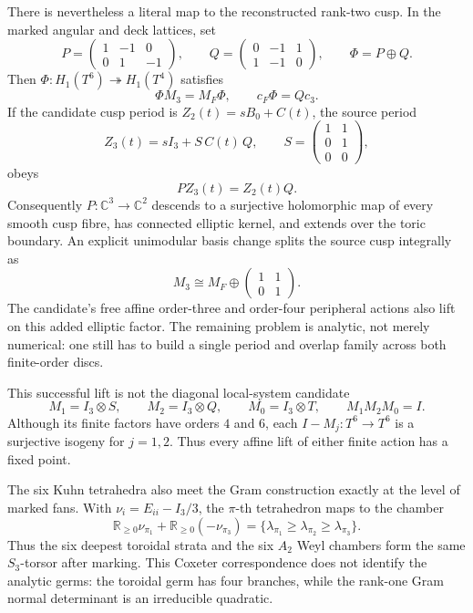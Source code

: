 \documentclass[10pt,letterpaper]{article}
\begin{document}
There is nevertheless a literal map to the reconstructed rank-two cusp.  In
the marked angular and deck lattices, set
\[
 P=\begin{pmatrix}1&-1&0\\0&1&-1\end{pmatrix},
 \qquad
 Q=\begin{pmatrix}0&-1&1\\1&-1&0\end{pmatrix},
 \qquad \Phi=P\oplus Q.
\]
Then \(\Phi:H_1(T^6)\twoheadrightarrow H_1(T^4)\) satisfies
\[
 \boxed{\Phi M_3=M_F\Phi,\qquad c_F\Phi=Qc_3.}
\]
If the candidate cusp period is \(Z_2(t)=sB_0+C(t)\), the source period
\[
 Z_3(t)=sI_3+S\,C(t)\,Q,\qquad
 S=\begin{pmatrix}1&1\\0&1\\0&0\end{pmatrix},
\]
obeys
\[
 \boxed{PZ_3(t)=Z_2(t)Q.}
\]
Consequently \(P:\mathbb C^3\to\mathbb C^2\) descends to a surjective
holomorphic map of every smooth cusp fibre, has connected elliptic kernel,
and extends over the toric boundary.  An explicit unimodular basis change
splits the source cusp integrally as
\[
 M_3\cong M_F\oplus
 \begin{pmatrix}1&1\\0&1\end{pmatrix}.
\]
The candidate's free affine order-three and order-four peripheral actions
also lift on this added elliptic factor.  The remaining problem is analytic,
not merely numerical: one still has to build a single period and overlap
family across both finite-order discs.

This successful lift is not the diagonal local-system candidate
\[
 M_1=I_3\otimes S,\qquad M_2=I_3\otimes Q,\qquad M_0=I_3\otimes T,
 \qquad M_1M_2M_0=I.
\]
Although its finite factors have orders \(4\) and \(6\), each
\(I-M_j:T^6\to T^6\) is a surjective isogeny for \(j=1,2\).  Thus every
affine lift of either finite action has a fixed point.

The six Kuhn tetrahedra also meet the Gram construction exactly at the level
of marked fans.  With
\(\nu_i=E_{ii}-I_3/3\), the \(\pi\)-th tetrahedron maps to the chamber
\[
 \mathbb R_{\ge0}\nu_{\pi_1}
 +\mathbb R_{\ge0}(-\nu_{\pi_3})
 =\{\lambda_{\pi_1}\ge\lambda_{\pi_2}\ge\lambda_{\pi_3}\}.
\]
Thus the six deepest toroidal strata and the six \(A_2\) Weyl chambers form
the same \(S_3\)-torsor after marking.  This Coxeter correspondence does not
identify the analytic germs: the toroidal germ has four branches, while the
rank-one Gram normal determinant is an irreducible quadratic.
\end{document}
